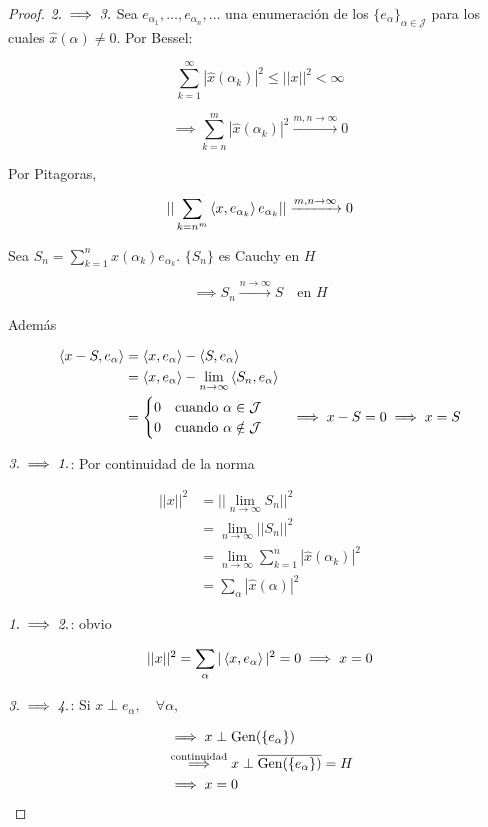 \begin{proof}
    $\emph{2.}\implies \emph{3.}$ Sea $e_{\alpha_1},\ldots,e_{\alpha_n},\ldots$ una enumeración de los $\{e_\alpha\}_{\alpha\in \mathcal{J}}$ para los cuales $\hat x(\alpha)\neq 0$. Por Bessel:

    \[\sum_{k=1}^\infty |\hat x(\alpha_k)|^2\leq ||x||^2<\infty\]

    \[\implies \sum_{k=n}^m |\hat x(\alpha_k)|^2\xrightarrow{m,n\to\infty} 0\]

    Por Pitagoras,

    \[||\sum_{k=n^m}\left\langle x,e_{\alpha_k}\right\rangle e_{\alpha_k}||\xrightarrow
    {m,n\to\infty} 0\]

    Sea $S_n=\sum_{k=1}^n \hat x(\alpha_k)e_{\alpha_k}$. $\{S_n\}$ es Cauchy en $H$

    \[\implies S_n\xrightarrow{n\to\infty} S\quad\text{en $H$}\]

    Además 

    \begin{align*}
        \left\langle x-S,e_\alpha\right\rangle&=\left\langle x,e_\alpha\right\rangle-\left\langle S,e_\alpha\right\rangle\\
        &=\left\langle x,e_\alpha\right\rangle-\lim_{n\to\infty} \left\langle S_n,e_\alpha\right\rangle\\
        &=\begin{cases}
            0 &\text{cuando $\alpha\in \mathcal{J}$}\\
            0 &\text{cuando $\alpha\notin \mathcal{J}$}
        \end{cases}
        &\implies x-S=0\implies x=S
    \end{align*}

    $\emph{3.}\implies \emph{1.}$: Por continuidad de la norma 

    \begin{align*}||x||^2&=||\lim_{n\to\infty} S_n||^2\\
        &=\lim_{n\to\infty} ||S_n||^2\\
        &=\lim_{n\to\infty} \sum_{k=1}^n |\hat x(\alpha_k)|^2\\
        &=\sum_\alpha |\hat x(\alpha)|^2
    \end{align*}

    $\emph{1.}\implies \emph{2.}$: obvio 

    \[||x||^2=\sum_\alpha |\left\langle x,e_\alpha\right\rangle|^2=0\implies x=0\]

    $\emph{3.}\implies \emph{4.}$: Si $x\perp e_\alpha,\quad\forall \alpha$, 

    \begin{align*}
        &\implies x\perp \operatorname{Gen}(\{e_\alpha\})\\
        &\overset{\text{continuidad}}{\implies} x\perp \overline{\operatorname{Gen}(\{e_\alpha\})}=H\\
        &\implies x=0
    \end{align*}

\end{proof}

